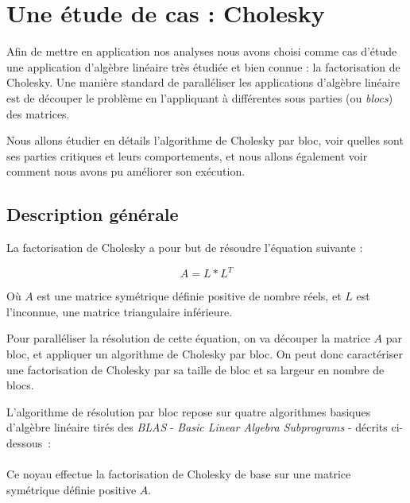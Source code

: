 \section{Une étude de cas : Cholesky}\label{sec:contribs:apps:cholesky}

Afin de mettre en application nos analyses nous avons choisi comme cas d'étude une application d'algèbre linéaire très étudiée et bien connue : la factorisation de Cholesky.
Une manière standard de paralléliser les applications d'algèbre linéaire est de découper le problème en l'appliquant à différentes sous parties (ou \emph{blocs}) des matrices.

Nous allons étudier en détails l'algorithme de Cholesky par bloc, voir quelles sont ses parties critiques et leurs comportements, et nous allons également voir comment nous avons pu améliorer son exécution.


\subsection{Description générale}

La factorisation de Cholesky a pour but de résoudre l'équation suivante :

$$ A = L*L^T$$

Où $A$ est une matrice symétrique définie positive de nombre réels, et $L$ est l'inconnue, une matrice triangulaire inférieure.

Pour paralléliser la résolution de cette équation, on va découper la matrice $A$ par bloc, et appliquer un algorithme de Cholesky par bloc.
On peut donc caractériser une factorisation de Cholesky par sa taille de bloc et sa largeur en nombre de blocs.

L'algorithme de résolution par bloc repose sur quatre algorithmes basiques d'algèbre linéaire tirés des \emph{BLAS} - \emph{Basic Linear Algebra Subprograms} - décrits ci-dessous~:


\paragraph{}

Ce noyau effectue la factorisation de Cholesky de base sur une matrice symétrique définie positive $A$.

\paragraph{}

